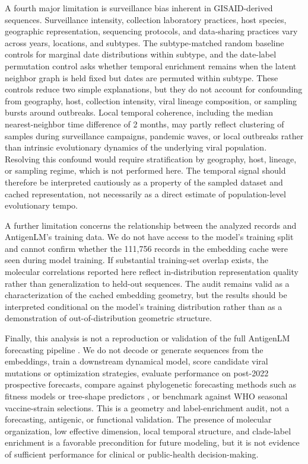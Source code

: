 \documentclass[11pt]{article}
\begin{document}
A fourth major limitation is surveillance bias inherent in GISAID-derived sequences. Surveillance intensity, collection laboratory practices, host species, geographic representation, sequencing protocols, and data-sharing practices vary across years, locations, and subtypes. The subtype-matched random baseline controls for marginal date distributions within subtype, and the date-label permutation control asks whether temporal enrichment remains when the latent neighbor graph is held fixed but dates are permuted within subtype. These controls reduce two simple explanations, but they do not account for confounding from geography, host, collection intensity, viral lineage composition, or sampling bursts around outbreaks. Local temporal coherence, including the median nearest-neighbor time difference of 2 months, may partly reflect clustering of samples during surveillance campaigns, pandemic waves, or local outbreaks rather than intrinsic evolutionary dynamics of the underlying viral population. Resolving this confound would require stratification by geography, host, lineage, or sampling regime, which is not performed here. The temporal signal should therefore be interpreted cautiously as a property of the sampled dataset and cached representation, not necessarily as a direct estimate of population-level evolutionary tempo.

A further limitation concerns the relationship between the analyzed records and AntigenLM's training data. We do not have access to the model's training split and cannot confirm whether the 111,756 records in the embedding cache were seen during model training. If substantial training-set overlap exists, the molecular correlations reported here reflect in-distribution representation quality rather than generalization to held-out sequences. The audit remains valid as a characterization of the cached embedding geometry, but the results should be interpreted conditional on the model's training distribution rather than as a demonstration of out-of-distribution geometric structure.

Finally, this analysis is not a reproduction or validation of the full AntigenLM forecasting pipeline \cite{pei2026antigenlm}. We do not decode or generate sequences from the embeddings, train a downstream dynamical model, score candidate viral mutations or optimization strategies, evaluate performance on post-2022 prospective forecasts, compare against phylogenetic forecasting methods such as fitness models or tree-shape predictors \cite{luksza2014fitness,neher2014predicting}, or benchmark against WHO seasonal vaccine-strain selections. This is a geometry and label-enrichment audit, not a forecasting, antigenic, or functional validation. The presence of molecular organization, low effective dimension, local temporal structure, and clade-label enrichment is a favorable precondition for future modeling, but it is not evidence of sufficient performance for clinical or public-health decision-making.
\end{document}
